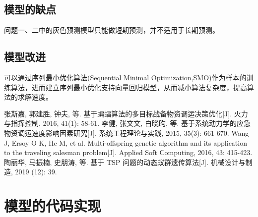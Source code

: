 \documentclass{whutmod}
\begin{document}
  \subsection{模型的缺点}
  
  问题一、二中的灰色预测模型只能做短期预测，并不适用于长期预测。
  \subsection{模型改进}
  
  可以通过序列最小优化算法(Sequential Minimal Optimization,SMO)作为样本的训练算法，进而建立序列最小优化支持向量回归模型，从而减小算法复杂度，提高算法的求解速度。
  
  
  
 
	\newpage	%
	\nocite{*}		%
%
%	
\begin{thebibliography}{9}%
	张斯嘉, 郭建胜, 钟夫, 等. 基于蝙蝠算法的多目标战备物资调运决策优化[J]. 火力与指挥控制, 2016, 41(1): 58-61.
	李健, 张文文, 白晓昀, 等. 基于系统动力学的应急物资调运速度影响因素研究[J]. 系统工程理论与实践, 2015, 35(3): 661-670.	
	Wang J, Ersoy O K, He M, et al. Multi-offspring genetic algorithm and its application to the traveling salesman problem[J]. Applied Soft Computing, 2016, 43: 415-423.
	陶丽华, 马振楠, 史朋涛, 等. 基于 TSP 问题的动态蚁群遗传算法[J]. 机械设计与制造, 2019 (12): 39.
\end{thebibliography}

	\newpage
	\appendix %

\section{模型的代码实现}
\end{document}
